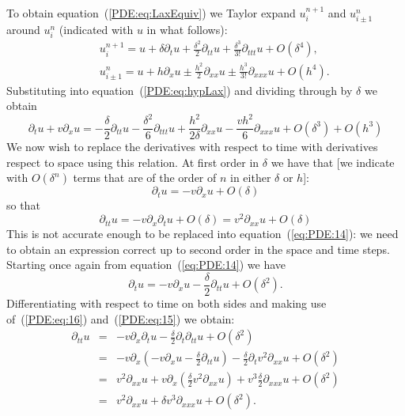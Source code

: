 To obtain equation~(\ref{PDE:eq:LaxEquiv}) we Taylor expand
$u_{i}^{n+1}$ and $u_{i\pm 1}^{n}$ around $u_{i}^{n}$ (indicated with
$u$ in what follows):
%
\begin{eqnarray*}
 & & u_{i}^{n+1} = u + \delta \partial_t u +
                 \frac{\delta^2}{2}\partial_{t t} u +
                 \frac{\delta^3}{3!} \partial_{t t t} u + O(\delta^4), \\
 & & u_{i\pm 1}^{n} = u + h \partial_x u \pm
                 \frac{h^2}{2}\partial_{x x} u \pm
                 \frac{h^3}{3!} \partial_{x x x} u + O(h^4) .
\end{eqnarray*}
%
Substituting into equation~(\ref{PDE:eq:hypLax}) and dividing through
by $\delta$ we obtain
%
\begin{equation}
  \partial_t u + v \partial_x u =
  -\frac{\delta}{2} \partial_{t t} u
  -\frac{\delta^2}{6} \partial_{t t t} u
  + \frac{h^2}{2 \delta} \partial_{x x} u
  - \frac{v h^2}{6} \partial_{x x x}u + O(\delta^3) + O(h^3)
  \label{eq:PDE:14}
\end{equation}
%
We now wish to replace the derivatives with respect to time with
derivatives respect to space using this relation.  At first order in
$\delta$ we have that [we indicate with $O(\delta^n)$ terms that are
of the order of $n$ in either $\delta$ or $h$]:
%
\begin{equation}
  \partial_t u = - v \partial_x u + O(\delta)
  \label{PDE:eq:16}
\end{equation}
%
so that
%
\begin{equation}
  \partial_{t t} u = - v \partial_x \partial_t u + O(\delta) =
  v^2 \partial_{x x} u + O(\delta)
  \label{PDE:eq:15}
\end{equation}
%
This is not accurate enough to be replaced into
equation~(\ref{eq:PDE:14}): we need to obtain an expression correct up
to second order in the space and time steps.  Starting once again from
equation~(\ref{eq:PDE:14}) we have
%
\begin{equation*}
  \partial_t u = -v \partial_x u
  - \frac{\delta}{2} \partial_{t t} u + O(\delta^2) .
\end{equation*}
%
Differentiating with respect to time on both sides and making use
of~(\ref{PDE:eq:16}) and~(\ref{PDE:eq:15}) we obtain:
%
\begin{eqnarray*}
 \partial_{t t} u & = & -v \partial_x \partial_t u
   - \frac{\delta}{2} \partial_t \partial_{t t} u + O(\delta^2) \\
  & = & -v \partial_x \left ( -v \partial_x u
   - \frac{\delta}{2} \partial_{t t} u \right )
   - \frac{\delta}{2} \partial_t v^2 \partial_{x x} u + O(\delta^2) \\
  & = & v^2 \partial_{x x} u + v \partial_x
        \left ( \frac{\delta}{2} v^2 \partial_{x x} u \right ) +
      v^3 \frac{\delta}{2} \partial_{x x x} u + O(\delta^2) \\
  & = & v^2 \partial_{x x} u + \delta v^3 \partial_{x x x} u +
      O(\delta^2).
\end{eqnarray*}
